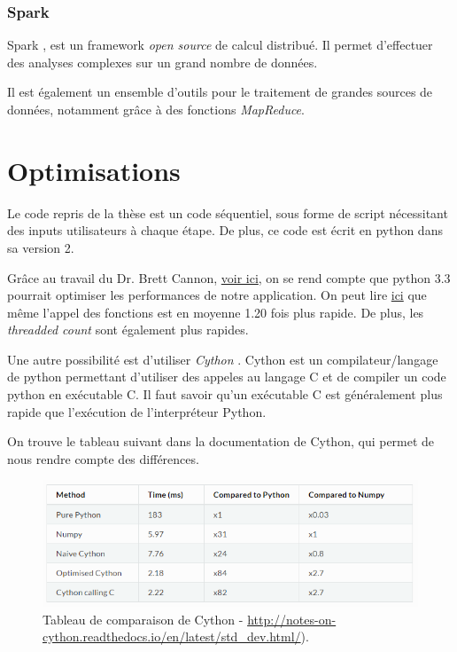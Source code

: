 \subsubsection{Spark}
Spark \cite{6},\cite{7} est un framework \emph{open source} de calcul distribué. Il permet d'effectuer des analyses complexes sur un grand nombre de données.

Il est également un ensemble d'outils pour le traitement de grandes sources de données, notamment grâce à des fonctions \emph{MapReduce}.
	
\section{Optimisations}
Le code repris de la thèse \thLeite est un code séquentiel, sous forme de script nécessitant des inputs utilisateurs à chaque étape. De plus, ce code est écrit en python dans sa version 2.

Grâce au travail du Dr. Brett Cannon, \href{https://speakerdeck.com/pyconslides/python-3-dot-3-trust-me-its-better-than-python-2-dot-7-by-dr-brett-cannon}{voir ici}, on se rend compte que python 3.3 pourrait optimiser les performances de notre application. On peut lire  \href{https://mail.python.org/pipermail/python-dev/2012-October/121923.html}{ici} que même l'appel des fonctions est en moyenne 1.20 fois plus rapide. De plus, les \emph{threadded count} sont également plus rapides.

Une autre possibilité est d'utiliser \emph{Cython} \cite{11}. Cython est un compilateur/langage de python permettant d'utiliser des appeles au langage C et de compiler un code python en exécutable C. Il faut savoir qu'un exécutable C est généralement plus rapide que l'exécution de l'interpréteur Python. 

On trouve le tableau suivant dans la documentation de Cython, qui permet de nous rendre compte des différences.

\begin{figure}[H] 
\centering 
\includegraphics[width=1\columnwidth]{img/table_cython} 
\caption[Tableau performences Cython]{Tableau de comparaison de Cython - \url{http://notes-on-cython.readthedocs.io/en/latest/std_dev.html/}).}
\label{fig:galleria} 
\end{figure}

